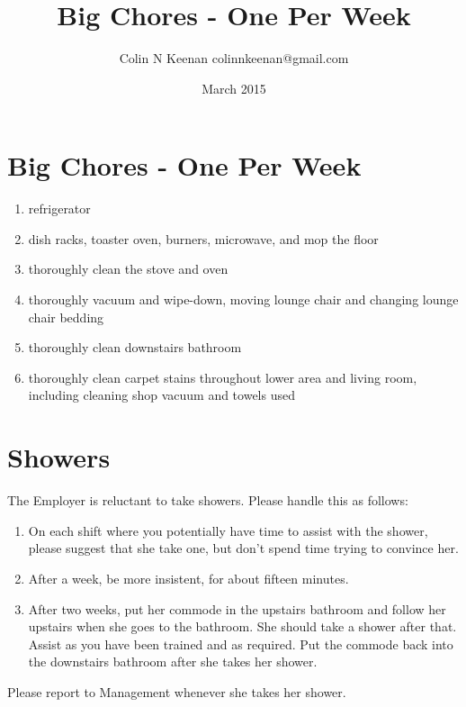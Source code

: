 \documentclass[12pt,letterpaper]{article}
\newcommand{\mytitle}{Big Chores - One Per Week}
\begin{document}
\title{\mytitle{}}
\author{Colin N Keenan colinnkeenan@gmail.com}
\date{March 2015}
\section*{\mytitle{}}
\begin{enumerate}
	\item refrigerator
	\item dish racks, toaster oven, burners, microwave, and mop the floor
	\item thoroughly clean the stove and oven
	\item thoroughly vacuum and wipe-down, moving lounge chair and changing lounge chair bedding
	\item thoroughly clean downstairs bathroom
	\item thoroughly clean carpet stains throughout lower area and living room, including cleaning shop vacuum and towels used
\end{enumerate}
\section*{Showers}
The Employer is reluctant to take showers. Please handle this as follows:
\begin{enumerate}
	\item On each shift where you potentially have time to assist with the shower, please suggest that she take one, but don't spend time trying to convince her.
	\item After a week, be more insistent, for about fifteen minutes.
	\item After two weeks, put her commode in the upstairs bathroom and follow her upstairs when she goes to the bathroom. She should take a shower after that. Assist as you have been trained and as required. Put the commode back into the downstairs bathroom after she takes her shower.
\end{enumerate}
Please report to Management whenever she takes her shower.
\end{document}
